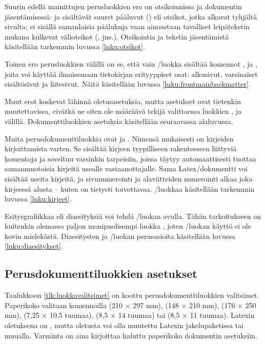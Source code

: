 Suurin edellä mainittujen perusluokkien ero on otsikoinnissa ja
dokumentin jäsentämisessä:  ja 
sisältävät suuret pääluvut () eli otsikot, jotka
alkavat tyhjältä sivulta;  ei sisällä samanlaisia
päälukuja vaan ainoastaan tavalliset leipätekstin mukana kulkevat
väliotsikot (, 
jne.). Otsikointia ja tekstin jäsentämistä käsitellään tarkemmin luvussa
\ref{luku:otsikot}.

Toinen ero perusluokkien välillä on se, että vain
\-/luokka sisältää komennot ,
 ja , joita voi
käyttää ilmaisemaan tietokirjan erityyppiset osat: alkusivut,
varsinaiset sisältösivut ja liitesivut. Näitä käsitellään luvussa
\ref{luku:frontmainbackmatter}.

Muut erot koskevat lähinnä oletusasetuksia, mutta asetukset ovat
tietenkin muutettavissa, eivätkä ne siten ole määräävä tekijä
valittaessa luokkien ,  ja
 välillä. Dokumenttiluokkien asetuksia käsitellään
seuraavassa alaluvussa.

Muita%
 perusdokumenttiluokkia ovat  ja
. Nimensä mukaisesti  on kirjeiden
kirjoittamista varten. Se sisältää kirjeen tyypilliseen rakenteeseen
liittyviä komentoja ja soveltuu varsinkin tarpeisiin, joissa täytyy
automaattisesti tuottaa samanmuotoisia kirjeitä usealle
vas\-taan\-otta\-jalle. Sama Latex\-/dokumentti voi sisältää useita
kirjeitä, ja sivunumerointi ja alaviitteiden numerointi alkaa joka
kirjeessä alusta -- kuten on tietysti toivottavaa.
\-/luokkaa käsitellään tarkemmin luvussa
\ref{luku:kirjeet}.

Esitys\-grafiikkaa%
 eli dia\-esityksiä voi tehdä
\-/luokan avulla. Tähän tarkoitukseen on kuitenkin
olemassa paljon monipuolisempi luokka , joten
\-/luokan käyttö ei ole kovin mielekästä.
Dia\-esi\-tys\-ten ja \-/luokan perus\-asioita
käsitellään luvussa \ref{luku:diaesitykset}.

\subsection{Perusdokumenttiluokkien asetukset}

Taulukkoon \ref{tlk:luokkavalitsimet} on koottu perusdokumenttiluokkien
valitsimet. Paperikoko valitaan komennoilla  (210 × 297
mm),  (148 × 210 mm),  (176 × 250 mm),
 (7,25 × 10,5 tuumaa), 
(8,5 × 14 tuumaa) tai  (8,5 × 11 tuumaa). Latexin
oletuksena on , mutta oletusta voi olla muutettu
Latexin jakelupaketissa tai muualla. Varminta on aina kirjoittaa haluttu
paperikoko dokumentin asetuksiin.

